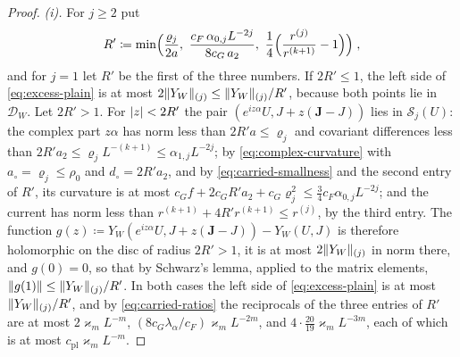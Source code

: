 \begin{proof}
\emph{(i).} For $j \geq 2$ put
\[
    R' \coloneqq \min\Bigl(\frac{\varrho_j}{2a},\ \frac{c_F\,\alpha_{0,j}L^{-2j}}{8c_G\,a_2},\ \frac14\Bigl(\frac{r^{(j)}}{r^{(k+1)}} - 1\Bigr)\Bigr)\;,
\]
and for $j = 1$ let $R'$ be the first of the three numbers. If $2R' \leq 1$, the left side of \eqref{eq:excess-plain} is at most $2\lVert Y_W\rVert_{(j)} \leq \lVert Y_W\rVert_{(j)}/R'$, because both points lie in $\mathcal D_W$. Let $2R' > 1$. For $\lvert z\rvert < 2R'$ the pair $(e^{iz\alpha}U, J + z(\mathbf J - J))$ lies in $\mathcal S_j(U)$: the complex part $z\alpha$ has norm less than $2R'a \leq \varrho_j$ and covariant differences less than $2R'a_2 \leq \varrho_jL^{-(k+1)} \leq \alpha_{1,j}L^{-2j}$; by \eqref{eq:complex-curvature} with $a_\circ = \varrho_j \leq \rho_0$ and $d_\circ = 2R'a_2$, and by \eqref{eq:carried-smallness} and the second entry of $R'$, its curvature is at most $c_Gf + 2c_GR'a_2 + c_G\varrho_j^2 \leq \frac34c_F\alpha_{0,j}L^{-2j}$; and the current has norm less than $r^{(k+1)} + 4R'r^{(k+1)} \leq r^{(j)}$, by the third entry. The function $g(z) \coloneqq Y_W(e^{iz\alpha}U, J + z(\mathbf J - J)) - Y_W(U, J)$ is therefore holomorphic on the disc of radius $2R' > 1$, it is at most $2\lVert Y_W\rVert_{(j)}$ in norm there, and $g(0) = 0$, so that by Schwarz's lemma, applied to the matrix elements, $\lVert g(1)\rVert \leq \lVert Y_W\rVert_{(j)}/R'$. In both cases the left side of \eqref{eq:excess-plain} is at most $\lVert Y_W\rVert_{(j)}/R'$, and by \eqref{eq:carried-ratios} the reciprocals of the three entries of $R'$ are at most $2\varkappa_mL^{-m}$, $(8c_G\lambda_\alpha/c_F)\varkappa_mL^{-2m}$, and $4 \cdot \frac{20}{19}\varkappa_mL^{-3m}$, each of which is at most $c_{\mathrm{pl}}\varkappa_mL^{-m}$.


\end{proof}
